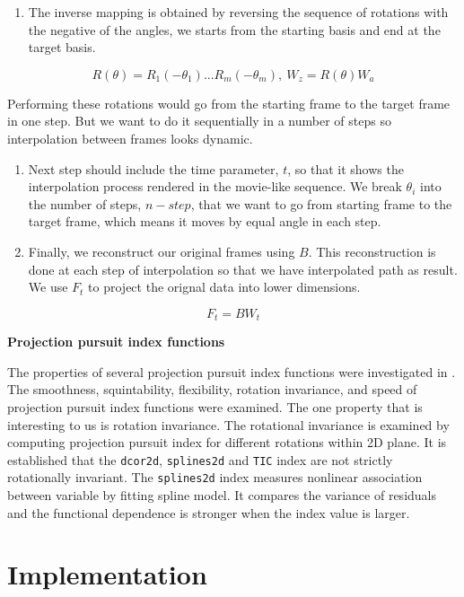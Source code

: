 \begin{enumerate}
\def\labelenumi{\arabic{enumi}.}
\setcounter{enumi}{3}
\tightlist
\item
  The inverse mapping is obtained by reversing the sequence of rotations
  with the negative of the angles, we starts from the starting basis and
  end at the target basis.
\end{enumerate}

\[R(\theta) = R_1(-\theta_1) ... R_m(-\theta_m), \    W_z = R(\theta)W_a\]

Performing these rotations would go from the starting frame to the
target frame in one step. But we want to do it sequentially in a number
of steps so interpolation between frames looks dynamic.

\begin{enumerate}
\def\labelenumi{\arabic{enumi}.}
\setcounter{enumi}{4}
\item
  Next step should include the time parameter, \(t\), so that it shows
  the interpolation process rendered in the movie-like sequence. We
  break \(\theta_i\) into the number of steps, \(n-step\), that we want
  to go from starting frame to the target frame, which means it moves by
  equal angle in each step.
\item
  Finally, we reconstruct our original frames using \(B\). This
  reconstruction is done at each step of interpolation so that we have
  interpolated path as result. We use \(F_t\) to project the orignal
  data into lower dimensions.
\end{enumerate}

\[F_t = B  W_t\]

\textbf{Projection pursuit index functions}

The properties of several projection pursuit index functions were
investigated in \citet{pp}. The smoothness, squintability, flexibility,
rotation invariance, and speed of projection pursuit index functions
were examined. The one property that is interesting to us is rotation
invariance. The rotational invariance is examined by computing
projection pursuit index for different rotations within 2D plane. It is
established that the \texttt{dcor2d}, \texttt{splines2d} and
\texttt{TIC} index are not strictly rotationally invariant. The
\texttt{splines2d} index measures nonlinear association between variable
by fitting spline model. It compares the variance of residuals and the
functional dependence is stronger when the index value is larger.

\hypertarget{implementation}{%
\section{Implementation}\label{implementation}}

